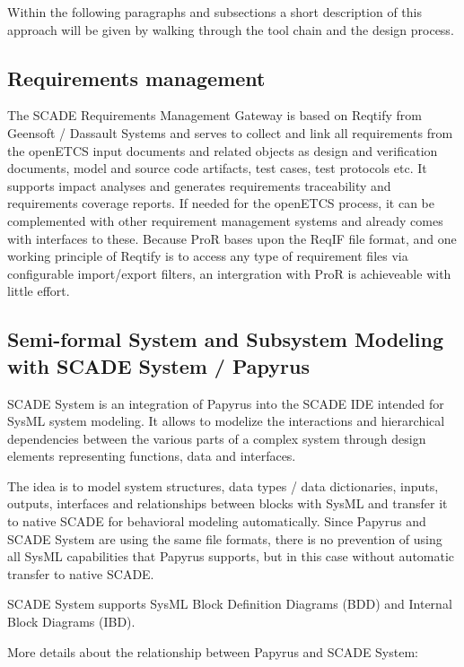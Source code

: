 Within the following paragraphs and subsections a short description of this approach will be given by walking through the tool chain and the design process. 

\subsection{Requirements management}
\label{sec:RequirementsManagement}

The SCADE Requirements Management Gateway is based on Reqtify from Geensoft / Dassault Systems and serves to collect and link all requirements from the openETCS input documents and related objects as design and verification documents, model and source code artifacts, test cases, test protocols etc. It supports impact analyses and generates requirements traceability and requirements coverage reports. 
If needed for the openETCS process, it can be complemented with other requirement management systems and already comes with interfaces to these. Because ProR bases upon the ReqIF file format, and one working principle of Reqtify is to access any type of requirement files via configurable import/export filters, an intergration with ProR is achieveable with little effort. 


\subsection{Semi-formal System and Subsystem Modeling with SCADE System / Papyrus}
\label{sec:SemiformalModelling}

SCADE System is an integration of Papyrus into the SCADE IDE intended for SysML system modeling. It allows to modelize the interactions and hierarchical dependencies between the various parts of a complex system through design elements representing functions, data and interfaces. 
 
The idea is to model system structures, data types / data dictionaries, inputs, outputs, interfaces and relationships between blocks with SysML and transfer it to native SCADE for behavioral modeling automatically. Since Papyrus and SCADE System are using the same file formats, there is no prevention of using all SysML capabilities that Papyrus supports, but in this case without automatic transfer to native SCADE. 

SCADE System supports SysML Block Definition Diagrams (BDD) and	Internal Block Diagrams (IBD).

More details about the relationship between Papyrus and SCADE System: 

